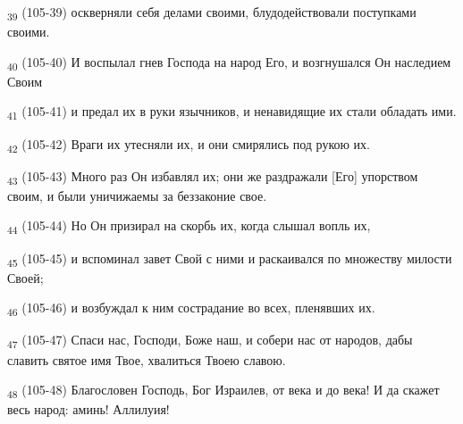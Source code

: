 \begin{tcolorbox}
\textsubscript{39} (105-39) оскверняли себя делами своими, блудодействовали поступками своими.
\end{tcolorbox}
\begin{tcolorbox}
\textsubscript{40} (105-40) И воспылал гнев Господа на народ Его, и возгнушался Он наследием Своим
\end{tcolorbox}
\begin{tcolorbox}
\textsubscript{41} (105-41) и предал их в руки язычников, и ненавидящие их стали обладать ими.
\end{tcolorbox}
\begin{tcolorbox}
\textsubscript{42} (105-42) Враги их утесняли их, и они смирялись под рукою их.
\end{tcolorbox}
\begin{tcolorbox}
\textsubscript{43} (105-43) Много раз Он избавлял их; они же раздражали [Его] упорством своим, и были уничижаемы за беззаконие свое.
\end{tcolorbox}
\begin{tcolorbox}
\textsubscript{44} (105-44) Но Он призирал на скорбь их, когда слышал вопль их,
\end{tcolorbox}
\begin{tcolorbox}
\textsubscript{45} (105-45) и вспоминал завет Свой с ними и раскаивался по множеству милости Своей;
\end{tcolorbox}
\begin{tcolorbox}
\textsubscript{46} (105-46) и возбуждал к ним сострадание во всех, пленявших их.
\end{tcolorbox}
\begin{tcolorbox}
\textsubscript{47} (105-47) Спаси нас, Господи, Боже наш, и собери нас от народов, дабы славить святое имя Твое, хвалиться Твоею славою.
\end{tcolorbox}
\begin{tcolorbox}
\textsubscript{48} (105-48) Благословен Господь, Бог Израилев, от века и до века! И да скажет весь народ: аминь! Аллилуия!
\end{tcolorbox}
